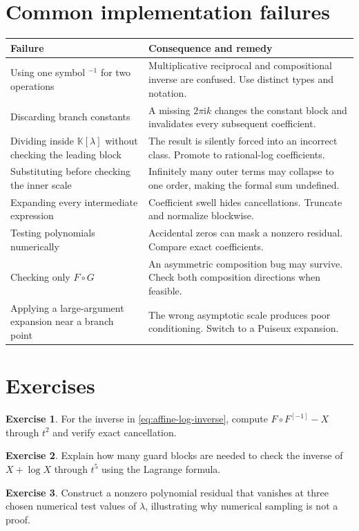 \documentclass[11pt,openany]{book}
\theoremstyle{definition}
\newtheorem{exercise}{Exercise}[chapter]
\theoremstyle{plain}
\theoremstyle{remark}
\newcommand{\K}{\mathbb{K}}
\newcommand{\ii}{\mathrm{i}}
\newcommand{\invcomp}{^{[-1]}}
\begin{document}
\section{Common implementation failures}
\begin{longtable}{@{}p{}p{}@{}}
\toprule
Failure & Consequence and remedy\\
\midrule
\endhead
Using one symbol \(^{-1}\) for two operations & Multiplicative reciprocal and compositional inverse are confused. Use distinct types and notation.\\
Discarding branch constants & A missing \(2\pi\ii k\) changes the constant block and invalidates every subsequent coefficient.\\
Dividing inside \(\K[\lambda]\) without checking the leading block & The result is silently forced into an incorrect class. Promote to rational-log coefficients.\\
Substituting before checking the inner scale & Infinitely many outer terms may collapse to one order, making the formal sum undefined.\\
Expanding every intermediate expression & Coefficient swell hides cancellations. Truncate and normalize blockwise.\\
Testing polynomials numerically & Accidental zeros can mask a nonzero residual. Compare exact coefficients.\\
Checking only \(F\circ G\) & An asymmetric composition bug may survive. Check both composition directions when feasible.\\
Applying a large-argument expansion near a branch point & The wrong asymptotic scale produces poor conditioning. Switch to a Puiseux expansion.\\
\bottomrule
\end{longtable}

\section{Exercises}
\begin{exercise}
For the inverse in \cref{eq:affine-log-inverse}, compute \(F\circ F\invcomp-X\) through \(t^2\) and verify exact cancellation.
\end{exercise}
\begin{exercise}
Explain how many guard blocks are needed to check the inverse of \(X+\log X\) through \(t^5\) using the Lagrange formula.
\end{exercise}
\begin{exercise}
Construct a nonzero polynomial residual that vanishes at three chosen numerical test values of \(\lambda\), illustrating why numerical sampling is not a proof.
\end{exercise}
\end{document}
